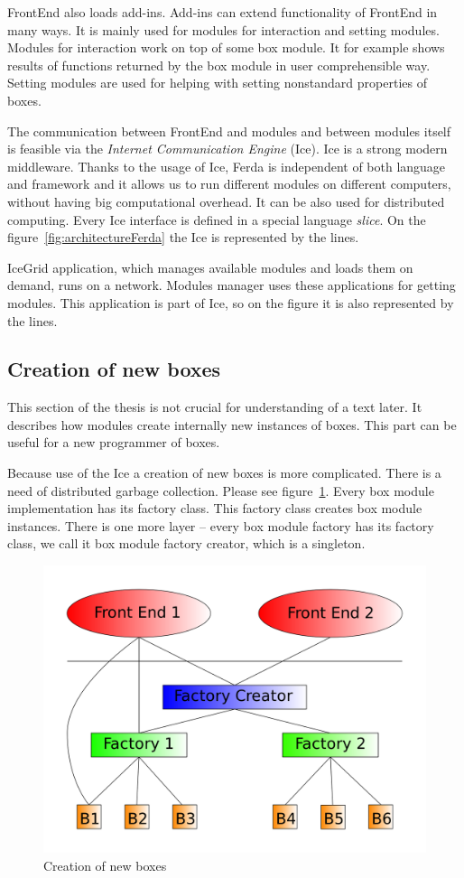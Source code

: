 \documentclass[a4paper,12pt]{book}
\begin{document}
FrontEnd also loads add-ins. Add-ins can extend functionality of FrontEnd in many ways. It is mainly used for modules for interaction and setting modules. Modules for interaction work on top of some box module. It for example shows results of functions returned by the box module in user comprehensible way. Setting modules are used for helping with setting nonstandard properties of boxes.

The communication between FrontEnd and modules and between modules itself is feasible via the \emph{Internet Communication Engine} (Ice). Ice is a strong modern middleware. Thanks to the usage of Ice, Ferda is independent of both language and framework and it allows us to run different modules on different computers, without having big computational overhead. It can be also used for distributed computing. Every Ice interface is defined in a special language \emph{slice}. On the figure~\ref{fig:architectureFerda} the Ice is represented by the lines.

IceGrid application, which manages available modules and loads them on demand, runs on a network. Modules manager uses these applications for getting modules. This application is part of Ice, so on the figure it is also represented by the lines.

\subsection{Creation of new boxes}
This section of the thesis is not crucial for understanding of a text later. It describes how modules create internally new instances of boxes. This part can be useful for a new programmer of boxes.  

Because use of the Ice a creation of new boxes is more complicated. There is a need of distributed garbage collection. Please see figure~\ref{fig:creatorFactory}. Every box module implementation has its factory class. This factory class creates box module instances. There is one more layer -- every box module factory has its factory class, we call it box module factory creator, which is a singleton.

\begin{figure}
	\noindent\includegraphics[width=1\textwidth]{creatorFactory}
	\caption{Creation of new boxes}
	\label{fig:creatorFactory}
\end{figure}
\end{document}
